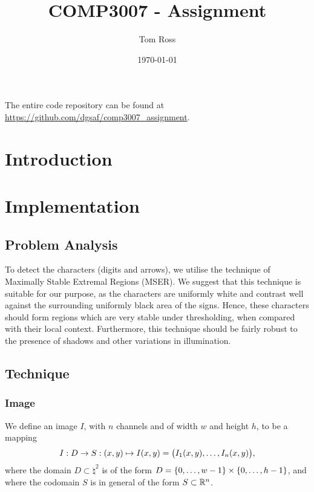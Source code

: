 \documentclass[draft]{article}
\title{COMP3007 - Assignment}
\author{Tom Ross}
\date{\today}
\begin{document}
The entire code repository can be found at
\url{https://github.com/dgsaf/comp3007_assignment}.

\tableofcontents

\listoffigures

\listoftables

\clearpage

\section{Introduction}
\label{sec:introduction}

\section{Implementation}
\label{sec:implementation}

\subsection{Problem Analysis}
\label{sec:problem-analysis}

To detect the characters (digits and arrows), we utilise the technique of Maximally
Stable Extremal Regions (MSER).
We suggest that this technique is suitable for our purpose, as the characters
are uniformly white and contrast well against the surrounding uniformly black
area of the signs.
Hence, these characters should form regions which are very stable under
thresholding, when compared with their local context.
Furthermore, this technique should be fairly robust to the presence of shadows
and other variations in illumination.

\subsection{Technique}
\label{sec:technique}

\subsubsection*{Image}

We define an image $I$, with $n$ channels and of width $w$ and height $h$, to be
a mapping
\begin{equation}
  \label{eq:def-image}
  I
  :
  D \to S
  :
  \lr{x, y}
  \mapsto
  I\lr{x, y}
  =
  \lr[\big]
  {
    I_{1}\lr{x, y}
    ,
    \dotsc
    ,
    I_{n}\lr{x, y}
  }
  ,
\end{equation}
where the domain $D \subset \natural^{2}$ is of the form
$D = \lbrace0, \dotsc, w - 1\rbrace \times \lbrace0, \dotsc, h - 1\rbrace$, and where the
codomain $S$ is in general of the form $S \subset \mathbb{R}^{n}$.
\end{document}
